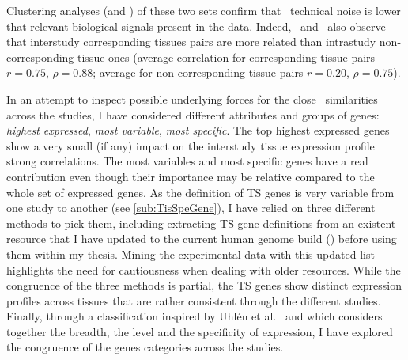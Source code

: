 Clustering analyses (and \Welchttest) of these two sets
confirm that \Rnaseq\ technical noise is
lower that relevant biological signals present in the data.
Indeed,~\cite{Sudmant2015-zt,Danielsson2015-cn,Yu2015-uh} and~\cite{Uhlen:2016}
also observe that interstudy corresponding tissues pairs are more related than
intrastudy non-corresponding tissue ones
(average correlation for corresponding tissue-pairs $r=0.75$, $\rho=0.88$;
average for non-corresponding tissue-pairs $r=0.20$, $\rho=0.75$).

In an attempt to inspect possible underlying forces for the close \treps\
similarities across the studies,
I have considered different attributes and groups of genes:
\emph{highest expressed}, \emph{most variable}, \emph{most specific}.
The top highest expressed genes show a very small (if any) impact on
the interstudy tissue expression profile strong correlations.
The most variables and most specific genes have a real contribution even though
their importance may be relative compared to the whole set of expressed genes.
As the definition of \gls{TS} genes is very variable from one study to another
(see \cref{sub:TisSpeGene}),
I have relied on three different methods to pick them,
including extracting \gls{TS} gene definitions
from an existent resource
that I have updated to the current human genome build ()
before using them within my thesis.
Mining the experimental data with this updated list highlights
the need for cautiousness when dealing with older resources.
While the congruence of the three methods is partial,
the \gls{TS} genes show distinct expression profiles across tissues
that are rather consistent through the different studies.
Finally, through a classification inspired
by Uhlén et al.\ 
and which considers together the breadth, the level and the specificity of expression,
I have explored the congruence of the genes categories across the studies.

